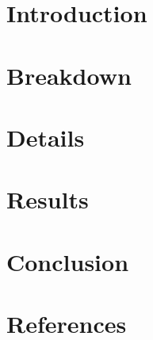 \documentclass[11pt]{article}
\begin{document}

\section{Introduction}
\label{sec:2_intro}


\section{Breakdown}
\label{sec:3_breakdown}


\section{Details}
\label{sec:4_details}



\section{Results}
\label{sec:5_results}


\section{Conclusion}
\label{sec:6_conclusion}




\renewcommand*{\UrlFont}{\rmfamily}



\nocite{*}

\section{References}



\appendix
\end{document}

